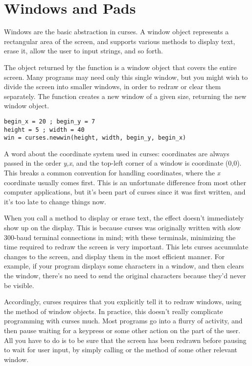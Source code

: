 \documentclass{howto}
\begin{document}
\section{Windows and Pads}

Windows are the basic abstraction in curses.  A window object
represents a rectangular area of the screen, and supports various
methods to display text, erase it, allow the user to input strings,
and so forth.

The  object returned by the  function
is a window object that covers the entire screen.  Many programs may
need only this single window, but you might wish to divide the screen
into smaller windows, in order to redraw or clear them separately.
The  function creates a new window of a given size,
returning the new window object.

\begin{verbatim}
begin_x = 20 ; begin_y = 7
height = 5 ; width = 40
win = curses.newwin(height, width, begin_y, begin_x)
\end{verbatim}

A word about the coordinate system used in curses: coordinates are
always passed in the order \emph{y,x}, and the top-left corner of a
window is coordinate (0,0).  This breaks a common convention for
handling coordinates, where the \emph{x} coordinate usually comes
first.  This is an unfortunate difference from most other computer
applications, but it's been part of curses since it was first written,
and it's too late to change things now.

When you call a method to display or erase text, the effect doesn't
immediately show up on the display.  This is because curses was
originally written with slow 300-baud terminal connections in mind;
with these terminals, minimizing the time required to redraw the
screen is very important.  This lets curses accumulate changes to the
screen, and display them in the most efficient manner.  For example,
if your program displays some characters in a window, and then clears
the window, there's no need to send the original characters because
they'd never be visible.  

Accordingly, curses requires that you explicitly tell it to redraw
windows, using the  method of window objects.  In
practice, this doesn't really complicate programming with curses much.
Most programs go into a flurry of activity, and then pause waiting for
a keypress or some other action on the part of the user.  All you have
to do is to be sure that the screen has been redrawn before pausing to
wait for user input, by simply calling  or the
 method of some other relevant window.
\end{document}
